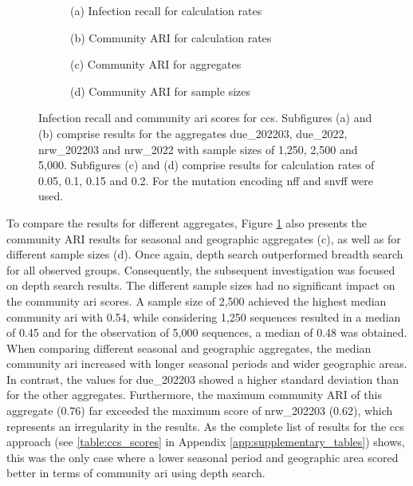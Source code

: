 \begin{figure}[ht!]
  \centering
  \begin{subfigure}[b]{0.47\textwidth}
    
    \caption*{(a) Infection recall for calculation rates}
  \end{subfigure}
  \hfill
  \begin{subfigure}[b]{0.47\textwidth}
    
    \caption*{(b) Community ARI for calculation rates}
  \end{subfigure}
  \begin{subfigure}[b]{0.47\textwidth}
    
    \caption*{(c) Community ARI for aggregates}
  \end{subfigure}
  \hfill
  \begin{subfigure}[b]{0.47\textwidth}
    
    \caption*{(d) Community ARI for sample sizes}
  \end{subfigure}
  \caption[Infection recall and community \acrshort{ari} scores for \acrshort{ccs}]{Infection recall and community \acrshort{ari} scores for \acrshort{ccs}. Subfigures (a) and (b) comprise results for the aggregates due\_202203, due\_2022, nrw\_202203 and nrw\_2022 with sample sizes of 1,250, 2,500 and 5,000. Subfigures (c) and (d) comprise results for calculation rates of 0.05, 0.1, 0.15 and 0.2. For the mutation encoding \acrshort{nff} and \acrshort{snvff} were used.}
  \label{fig:depth_vs_breadth}
\end{figure}

To compare the results for different aggregates, Figure \ref{fig:depth_vs_breadth} also presents the community ARI results for seasonal and geographic aggregates (c), as well as for different sample sizes (d). Once again, depth search outperformed breadth search for all observed groups. Consequently, the subsequent investigation was focused on depth search results. The different sample sizes had no significant impact on the community \acrshort{ari} scores. A sample size of 2,500 achieved the highest median community \acrshort{ari} with 0.54, while considering 1,250 sequences resulted in a median of 0.45 and for the observation of 5,000 sequences, a median of 0.48 was obtained. When comparing different seasonal and geographic aggregates, the median community \acrshort{ari} increased with longer seasonal periods and wider geographic areas. In contrast, the values for due\_202203 showed a higher standard deviation than for the other aggregates. Furthermore, the maximum community ARI of this aggregate (0.76) far exceeded the maximum score of nrw\_202203 (0.62), which represents an irregularity in the results. As the complete list of results for the \acrshort{ccs} approach (see \ref{table:ccs_scores} in Appendix \ref{app:supplementary_tables}) shows, this was the only case where a lower seasonal period and geographic area scored better in terms of community \acrshort{ari} using depth search.

